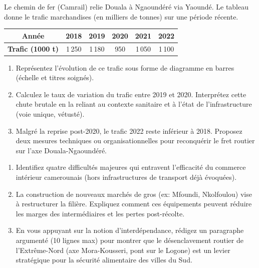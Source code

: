 \documentclass[11pt]{article}
\begin{document}
\begin{exercice}
Le chemin de fer (Camrail) relie Douala à Ngaoundéré via Yaoundé. Le tableau donne le trafic marchandises (en milliers de tonnes) sur une période récente.

\begin{center}
\begin{tabular}{|c|c|c|c|c|c|}
\hline
\textbf{Année} & 2018 & 2019 & 2020 & 2021 & 2022 \\
\hline
\textbf{Trafic (1000 t)} & 1\,250 & 1\,180 & 950 & 1\,050 & 1\,100 \\
\hline
\end{tabular}
\end{center}

\begin{enumerate}
    \item Représentez l'évolution de ce trafic sous forme de diagramme en barres (échelle et titres soignés).
    \item Calculez le taux de variation du trafic entre 2019 et 2020. Interprétez cette chute brutale en la reliant au contexte sanitaire et à l'état de l'infrastructure (voie unique, vétusté).
    \item Malgré la reprise post-2020, le trafic 2022 reste inférieur à 2018. Proposez deux mesures techniques ou organisationnelles pour reconquérir le fret routier sur l'axe Douala-Ngaoundéré.
\end{enumerate}
\end{exercice}

\begin{exercice}
\begin{enumerate}
    \item Identifiez quatre difficultés majeures qui entravent l'efficacité du commerce intérieur camerounais (hors infrastructures de transport déjà évoquées).
    \item La construction de nouveaux marchés de gros (ex: Mfoundi, Nkolfoulou) vise à restructurer la filière. Expliquez comment ces équipements peuvent réduire les marges des intermédiaires et les pertes post-récolte.
    \item En vous appuyant sur la notion d'interdépendance, rédigez un paragraphe argumenté (10 lignes max) pour montrer que le désenclavement routier de l'Extrême-Nord (axe Mora-Kousseri, pont sur le Logone) est un levier stratégique pour la sécurité alimentaire des villes du Sud.
\end{enumerate}
\end{exercice}
\end{document}
